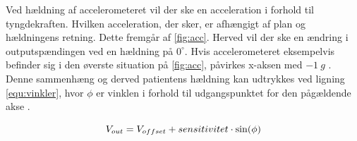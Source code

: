 \noindent
Ved hældning af accelerometeret vil der ske en acceleration i forhold til tyngdekraften. Hvilken acceleration, der sker, er afhængigt af plan og hældningens retning. Dette fremgår af \autoref{fig:acc}. Herved vil der ske en ændring i outputspændingen ved en hældning på $0^{\circ}$. Hvis accelerometeret eksempelvis befinder sig i den øverste situation på \autoref{fig:acc}, påvirkes x-aksen med $-1~g$ \citep{clifford2005}. Denne sammenhæng og derved patientens hældning kan udtrykkes ved ligning \autoref{equ:vinkler}, hvor $\phi$ er vinklen i forhold til udgangspunktet for den pågældende akse \citep{clifford2005}.

\begin{equation} \label{equ:vinkler}
	V_{out} = V_{offset} + sensitivitet \cdot \sin(\phi) \\
\end{equation}

\noindent
